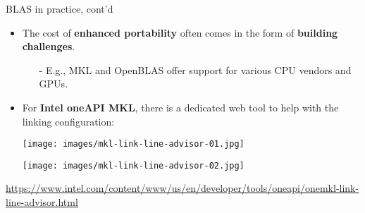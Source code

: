 \documentclass[t,usepdftitle=false]{beamer}
\begin{document}
\begin{frame}{BLAS in practice, cont'd}
\begin{itemize}
\item The cost of \textbf{enhanced portability} often comes in the form of \textbf{building challenges}.
\begin{itemize}
\item[-] E.g., MKL and OpenBLAS offer support for various CPU vendors and GPUs.
\end{itemize}
\item For \textbf{Intel oneAPI MKL}, there is a dedicated web tool to help with the linking configuration:\vspace{-.25cm}\\
\begin{minipage}[t]{0.44\textwidth}
\begin{center}
\texttt{[image: images/mkl-link-line-advisor-01.jpg]}
\end{center}
\end{minipage}
\begin{minipage}[t]{0.44\textwidth}
\begin{center}
\texttt{[image: images/mkl-link-line-advisor-02.jpg]}
\end{center}
\end{minipage}
\end{itemize}
\tiny{\url{https://www.intel.com/content/www/us/en/developer/tools/oneapi/onemkl-link-line-advisor.html}}
\end{frame}
\end{document}
